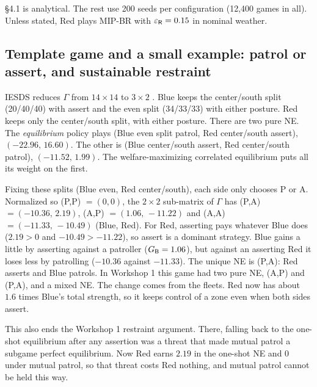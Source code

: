 \begin{addblock}
\S4.1 is analytical. The rest use 200 seeds per configuration (12{,}400 games in all).
Unless stated, Red plays MIP-BR with $\varepsilon_{\mathsf{R}}=0.15$ in nominal weather.

\subsection{Template game and a small example: patrol or assert, and sustainable restraint}
IESDS reduces $\Gamma$ from $14\times14$ to $3\times2$ . Blue keeps the center/south split (20/40/40) with
assert and the even split (34/33/33) with either posture. Red keeps only the center/south split, with either posture.
There are two pure NE. The \emph{equilibrium} policy plays (Blue even split patrol, Red center/south assert),
$(-22.96,\,16.60)$. The other is (Blue center/south assert, Red center/south patrol), $(-11.52,\,1.99)$. The
welfare-maximizing correlated equilibrium puts all its weight on the first.

Fixing these splits (Blue even, Red center/south), each side only chooses P or A. Normalized so (P,P) $=(0,0)$, the
$2\times2$ sub-matrix of $\Gamma$ has (P,A) $=(-10.36,\,2.19)$, (A,P) $=(1.06,\,-11.22)$ and (A,A) $=(-11.33,\,-10.49)$
(Blue, Red). For Red, asserting pays whatever Blue does ($2.19>0$ and $-10.49>-11.22$), so assert is a dominant strategy.
Blue gains a little by asserting against a patroller ($G_{\mathsf{B}}=1.06$), but against an asserting Red it loses less by
patrolling ($-10.36$ against $-11.33$). The unique NE is (P,A): Red asserts and Blue patrols. In Workshop 1 this game
had two pure NE, (A,P) and (P,A), and a mixed NE. The change comes from the fleets. Red now has about $1.6$ times Blue's
total strength, so it keeps control of a zone even when both sides assert.

This also ends the Workshop 1 restraint argument. There, falling back to the one-shot equilibrium after any assertion
was a threat that made mutual patrol a subgame perfect equilibrium. Now Red earns $2.19$ in the one-shot NE and
$0$ under mutual patrol, so that threat costs Red nothing, and mutual patrol cannot be held this way.


\end{addblock}
